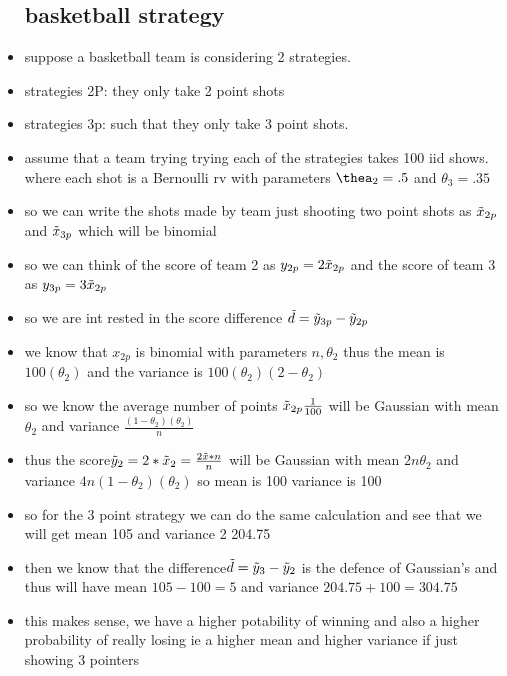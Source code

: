 \documentclass{article}
\begin{document}
\begin{itemize}
\subsection{basketball strategy}
\item suppose a basketball team is considering 2 strategies. 
\item strategies 2P: they only take 2 point shots
\item strategies 3p: such that they only take 3 point shots. 
\item assume that a team trying trying each of the strategies takes 100 iid shows. where each shot is a Bernoulli rv with parameters $\thea_{2}=.5$ and $\theta_{3}=.35$
\item  so we can write the shots made by team just shooting two point shots as $\Tilde{x}_{2p}$ and $\Tilde{x}_{3p}$ which will be binomial
\item so we can think of the score of team 2 as $y_{2p}=2\Tilde{x}_{2p}$ and the score of team 3 as $y_{3p}=3\Tilde{x}_{2p}$  
\item so we are int rested in the score difference $\Tilde{d}=\Tilde{y}_{3p}-\Tilde{y}_{2p}$
\item we know that $x_{2p}$ is binomial with parameters $n,\theta_2$ thus the mean is $100(\theta_2)$ and the variance is $100(\theta_2)(2-\theta_2)$
\item so we know the average number of points 
$\Tilde{x}_{2p}\frac{1}{100}$ will be Gaussian with mean $\theta_2$ and variance $\frac{(1-\theta_2)(\theta_2)}{n}$
\item thus the score$\Tilde{y}_2=2*\Tilde{x}_2=\frac{2\Tilde{x}*n}{n}$ will be Gaussian with mean $2n\theta_2$ and variance $4n(1-\theta_2)(\theta_2)$ so mean is 100 variance is 100
\item so for the 3 point strategy we can do the same calculation and see that we will get mean 105 and variance 2 204.75
\item then we know that the difference$\Tilde{d}=\Tilde{y}_3-
\Tilde{y}_2$ is the defence of Gaussian's and thus will have mean $105-100=5$ and variance $204.75+100=304.75$
\item this makes sense, we have a higher potability of winning and also a higher probability of really losing ie a higher mean and higher variance if just showing 3 pointers

\end{itemize}
\end{document}

